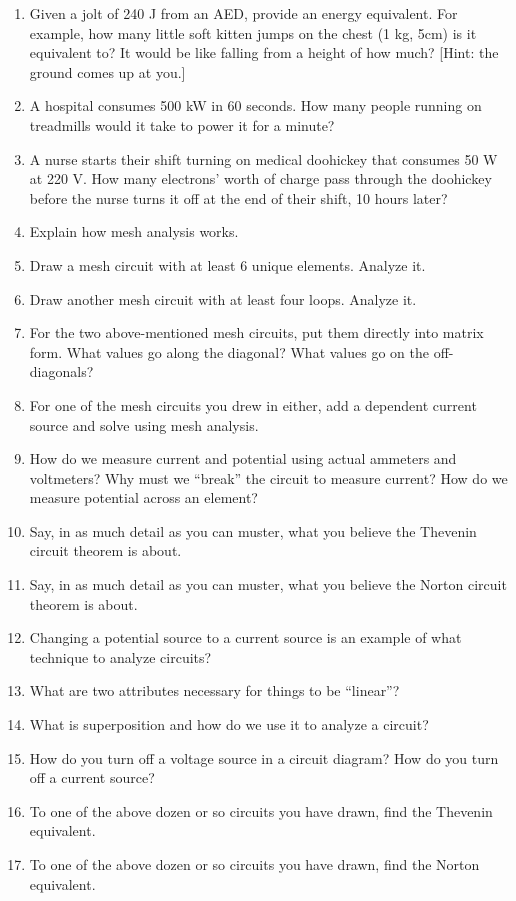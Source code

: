 \documentclass[11pt]{book}
\begin{document}
\begin{enumerate}
	\item Given a jolt of 240 J from an AED, provide an energy equivalent. For example, how many little soft kitten jumps on the chest (1 kg, 5cm) is it equivalent to? It would be like falling from a height of how much? [Hint: the ground comes up at you.]
	\item A hospital consumes 500 kW in 60 seconds. How many people running on treadmills would it take to power it for a minute?
	\item A nurse starts their shift turning on medical doohickey that consumes 50 W at 220 V. How many electrons’ worth of charge pass through the doohickey before the nurse turns it off at the end of their shift, 10 hours later?
	\item Explain how mesh analysis works.
	\item Draw a mesh circuit with at least 6 unique elements. Analyze it.
	\item Draw another mesh circuit with at least four loops. Analyze it.
	\item For the two above-mentioned mesh circuits, put them directly into matrix form. What values go along the diagonal? What values go on the off-diagonals?
	\item For one of the mesh circuits you drew in either, add a dependent current source and solve using mesh analysis.
	\item How do we measure current and potential using actual ammeters and voltmeters? Why must we “break” the circuit to measure current? How do we measure potential across an element?
	\item Say, in as much detail as you can muster, what you believe the Thevenin circuit theorem is about.
	\item Say, in as much detail as you can muster, what you believe the Norton circuit theorem is about.
	\item Changing a potential source to a current source is an example of what technique to analyze circuits?
	\item What are two attributes necessary for things to be ``linear''?
	\item What is superposition and how do we use it to analyze a circuit?
	\item How do you turn off a voltage source in a circuit diagram? How do you turn off a current source?
	\item To one of the above dozen or so circuits you have drawn, find the Thevenin equivalent.
	\item To one of the above dozen or so circuits you have drawn, find the Norton equivalent.

\end{enumerate}
\end{document}

